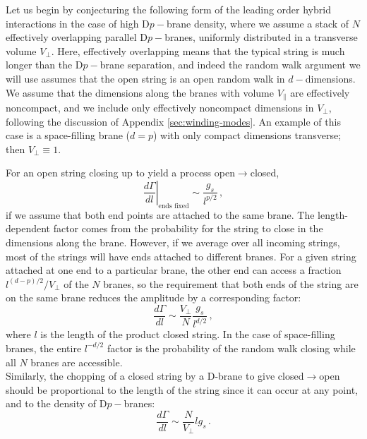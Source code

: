\documentclass[a4paper,11pt]{article}
\begin{document}
Let us begin by conjecturing the following form of the leading order hybrid interactions in the case of high D$p-$brane density, where we assume a stack of $N$ effectively overlapping parallel D$p-$branes, uniformly distributed in a transverse volume $V_{\perp}$.
Here, effectively overlapping means that the typical string is much longer than the D$p-$brane separation, and indeed the random walk argument we will use assumes that the open string is an open random walk in $d-$dimensions. 
We assume that the dimensions along the branes with volume $V_\|$ are 
effectively noncompact, and we include only effectively noncompact dimensions 
in $V_\perp$, following the discussion of Appendix \ref{sec:winding-modes}.
An example of this case is a space-filling brane ($d=p$) with only compact
dimensions transverse; then $V_\perp\equiv 1$.

For an open string closing up to yield a process open$\rightarrow$closed,
\begin{equation}
    \left.\frac{d\Gamma}{dl}\right|_{\text{ends fixed}}
\sim\frac{g_s}{l^{p/2}} \, ,
\end{equation}
if we assume that both end points are attached to the same brane. The
length-dependent factor comes from the probability for the string to close
in the dimensions along the brane. However, if we average over all incoming
strings, most of the strings will have ends attached to different branes.
For a given string attached at one end to a particular brane, the other end
can access a fraction $l^{(d-p)/2}/V_\perp$ of the $N$ branes, so the requirement
that both ends of the string are on the same brane reduces the amplitude
by a corresponding factor:
\begin{equation}
    \frac{d\Gamma}{dl}\sim \frac{V_{\perp}}{N}\frac{g_s}{l^{d/2}} \, ,
\end{equation}
where $l$ is the length of the product closed string.
In the case of space-filling branes, the entire $l^{-d/2}$ factor is the
probability of the random walk closing while all $N$ branes are accessible.
\\

Similarly, the chopping of a closed string by a D-brane to give closed$\rightarrow$open should be proportional to the length of the string since it can occur at any point, and to the density of D$p-$branes:
\begin{equation}
    \frac{d\Gamma}{dl}\sim \frac{N}{V_{\perp}}lg_s \, .
\end{equation} 
\\
\end{document}
